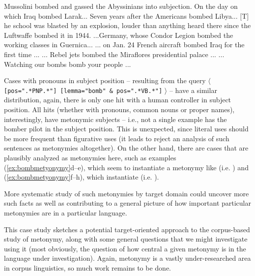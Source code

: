 \begin{exe}
\ex
\begin{xlist}
\label{ex:bombmetyonymy}
\ex Mussolini bombed and gassed the Abyssinians into subjection.
\ex On the day on which Iraq bombed Larak...
\ex Seven years after the Americans bombed Libya...
\ex $[$T$]$he school was blasted by an explosion, louder than anything heard there since the Luftwaffe bombed it in 1944.
\ex ...Germany, whose Condor Legion bombed the working classes in Guernica...
\ex ... on Jan. 24 French aircraft bombed Iraq for the first time ...
\ex ... Rebel jets bombed the Miraflores presidential palace ...
\ex ... Watching our bombs bomb your people ...
\end{xlist}
\end{exe}

Cases with pronouns  in subject position -- resulting from the query $\langle$ \texttt{[pos=".*PNP.*"] [lemma="bomb" \& pos=".*VB.*"]} $\rangle$ -- have a similar distribution,  again, there is only one hit with a human  controller in subject position. All hits (whether with pronouns, common nouns  or proper names), interestingly, have metonymic  subjects -- i.e., not a single example has the bomber pilot in the subject position. This is unexpected, since literal  uses should be more frequent than figurative  uses (it leads \citet{stefanowitsch_metonymies_2015} to reject an analysis of such sentences as metonymies altogether). On the other hand, there are cases that are plausibly analyzed as metonymies  here, such as examples (\ref{ex:bombmetyonymy}d--e), which seem to instantiate a metonymy like  (i.e. ) and (\ref{ex:bombmetyonymy}f--h), which instantiate  (i.e. ).

More systematic study of such metonymies  by target domain could uncover more such facts as well as contributing to a general picture of how important particular metonymies are in a particular language.

This case study sketches a potential target\hyp{}oriented approach to the corpus\hyp{}based study of metonymy,  along with some general questions that we might investigate using it (most obviously, the question of how central a given metonymy is in the language under investigation). Again, metonymy is a vastly under\hyp{}researched area in corpus linguistics, so much work remains to be done.